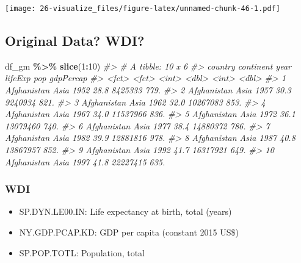 \documentclass[
  xelatex, ja=standard]{bxjsbook}
\newenvironment{Shaded}{\begin{snugshade}}{\end{snugshade}}
\newcommand{\CommentTok}[1]{\textcolor[rgb]{0.56,0.35,0.01}{\textit{#1}}}
\newcommand{\DecValTok}[1]{\textcolor[rgb]{0.00,0.00,0.81}{#1}}
\newcommand{\FunctionTok}[1]{\textcolor[rgb]{0.13,0.29,0.53}{\textbf{#1}}}
\newcommand{\NormalTok}[1]{#1}
\newcommand{\SpecialCharTok}[1]{\textcolor[rgb]{0.81,0.36,0.00}{\textbf{#1}}}
\providecommand{\tightlist}{%
  \setlength{\itemsep}{0pt}\setlength{\parskip}{0pt}}
\theoremstyle{definition}
\theoremstyle{definition}
\theoremstyle{definition}
\theoremstyle{definition}
\theoremstyle{remark}
\begin{document}
\texttt{[image: 26-visualize\_files/figure-latex/unnamed-chunk-46-1.pdf]}

\hypertarget{original-data-wdi}{%
\subsection{Original Data? WDI?}\label{original-data-wdi}}

\begin{Shaded}
\begin{Highlighting}[]
\NormalTok{df\_gm }\SpecialCharTok{\%\textgreater{}\%} \FunctionTok{slice}\NormalTok{(}\DecValTok{1}\SpecialCharTok{:}\DecValTok{10}\NormalTok{)}
\CommentTok{\#\textgreater{} \# A tibble: 10 x 6}
\CommentTok{\#\textgreater{}    country     continent  year lifeExp      pop gdpPercap}
\CommentTok{\#\textgreater{}    \textless{}fct\textgreater{}       \textless{}fct\textgreater{}     \textless{}int\textgreater{}   \textless{}dbl\textgreater{}    \textless{}int\textgreater{}     \textless{}dbl\textgreater{}}
\CommentTok{\#\textgreater{}  1 Afghanistan Asia       1952    28.8  8425333      779.}
\CommentTok{\#\textgreater{}  2 Afghanistan Asia       1957    30.3  9240934      821.}
\CommentTok{\#\textgreater{}  3 Afghanistan Asia       1962    32.0 10267083      853.}
\CommentTok{\#\textgreater{}  4 Afghanistan Asia       1967    34.0 11537966      836.}
\CommentTok{\#\textgreater{}  5 Afghanistan Asia       1972    36.1 13079460      740.}
\CommentTok{\#\textgreater{}  6 Afghanistan Asia       1977    38.4 14880372      786.}
\CommentTok{\#\textgreater{}  7 Afghanistan Asia       1982    39.9 12881816      978.}
\CommentTok{\#\textgreater{}  8 Afghanistan Asia       1987    40.8 13867957      852.}
\CommentTok{\#\textgreater{}  9 Afghanistan Asia       1992    41.7 16317921      649.}
\CommentTok{\#\textgreater{} 10 Afghanistan Asia       1997    41.8 22227415      635.}
\end{Highlighting}
\end{Shaded}

\hypertarget{wdi-1}{%
\subsubsection{WDI}\label{wdi-1}}

\begin{itemize}
\tightlist
\item
  SP.DYN.LE00.IN: Life expectancy at birth, total (years)
\item
  NY.GDP.PCAP.KD: GDP per capita (constant 2015 US\$)
\item
  SP.POP.TOTL: Population, total
\end{itemize}
\end{document}
